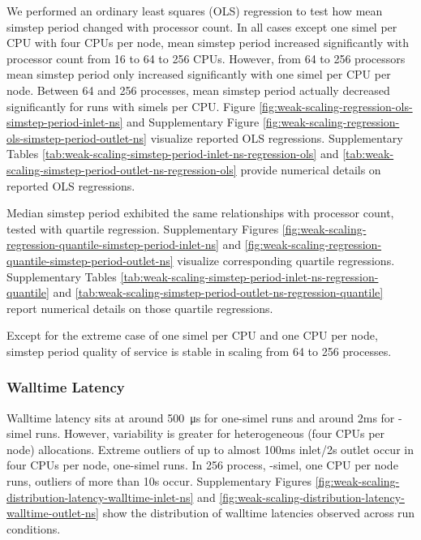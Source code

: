 

We performed an ordinary least squares (OLS) regression to test how mean simstep period changed with processor count.
In all cases except one simel per CPU with four CPUs per node, mean simstep period increased significantly with processor count from 16 to 64 to 256 CPUs.
However, from 64 to 256 processors mean simstep period only increased significantly with one simel per CPU per node.
Between 64 and 256 processes, mean simstep period actually decreased significantly for runs with  simels per CPU.
Figure \ref{fig:weak-scaling-regression-ols-simstep-period-inlet-ns} and Supplementary Figure \ref{fig:weak-scaling-regression-ols-simstep-period-outlet-ns} visualize reported OLS regressions.
Supplementary Tables \ref{tab:weak-scaling-simstep-period-inlet-ns-regression-ols} and \ref{tab:weak-scaling-simstep-period-outlet-ns-regression-ols} provide numerical details on reported OLS regressions.

Median simstep period exhibited the same relationships with processor count, tested with quartile regression.
Supplementary Figures \ref{fig:weak-scaling-regression-quantile-simstep-period-inlet-ns} and \ref{fig:weak-scaling-regression-quantile-simstep-period-outlet-ns} visualize corresponding quartile regressions.
Supplementary Tables \ref{tab:weak-scaling-simstep-period-inlet-ns-regression-quantile} and \ref{tab:weak-scaling-simstep-period-outlet-ns-regression-quantile} report numerical details on those quartile regressions.

Except for the extreme case of one simel per CPU and one CPU per node, simstep period quality of service is stable in scaling from 64 to 256 processes.

\subsubsection{Walltime Latency}

Walltime latency sits at around \SI{500}{\micro\second} for one-simel runs and around 2ms for -simel runs.
However, variability is greater for heterogeneous (four CPUs per node) allocations.
Extreme outliers of up to almost 100ms inlet/2s outlet occur in four CPUs per node, one-simel runs.
In 256 process, -simel, one CPU per node runs, outliers of more than 10s occur.
Supplementary Figures \ref{fig:weak-scaling-distribution-latency-walltime-inlet-ns} and \ref{fig:weak-scaling-distribution-latency-walltime-outlet-ns} show the distribution of walltime latencies observed across run conditions.

